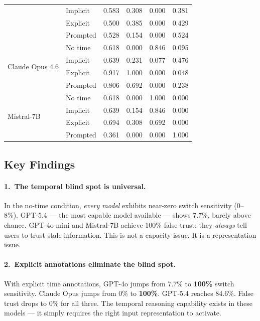 \documentclass[11pt,a4paper]{article}
\begin{document}
\begin{table}[h]
\begin{tabular}{llcccc}
  & Implicit  & 0.583 & 0.308 & 0.000 & 0.381 \\
  & Explicit  & 0.500 & 0.385 & 0.000 & 0.429 \\
  & Prompted  & 0.528 & 0.154 & 0.000 & 0.524 \\
\midrule
\multirow{4}{*}{Claude Opus 4.6}
  & No time   & 0.618 & 0.000 & 0.846 & 0.095 \\
  & Implicit  & 0.639 & 0.231 & 0.077 & 0.476 \\
  & Explicit  & 0.917 & 1.000 & 0.000 & 0.048 \\
  & Prompted  & 0.806 & 0.692 & 0.000 & 0.238 \\
\midrule
\multirow{4}{*}{Mistral-7B}
  & No time   & 0.618 & 0.000 & 1.000 & 0.000 \\
  & Implicit  & 0.639 & 0.154 & 0.846 & 0.000 \\
  & Explicit  & 0.694 & 0.308 & 0.692 & 0.000 \\
  & Prompted  & 0.361 & 0.000 & 0.000 & 1.000 \\
\bottomrule
\end{tabular}
\end{table}

\subsection{Key Findings}

\paragraph{1.\ The temporal blind spot is universal.}
In the no-time condition, \emph{every model} exhibits near-zero switch sensitivity (0--8\%).
GPT-5.4 --- the most capable model available --- shows 7.7\%, barely above chance.
GPT-4o-mini and Mistral-7B achieve 100\% false trust: they \emph{always} tell users to trust stale information.
This is not a capacity issue.
It is a representation issue.

\paragraph{2.\ Explicit annotations eliminate the blind spot.}
With explicit time annotations, GPT-4o jumps from 7.7\% to \textbf{100\%} switch sensitivity.
Claude Opus jumps from 0\% to \textbf{100\%}.
GPT-5.4 reaches 84.6\%.
False trust drops to 0\% for all three.
The temporal reasoning capability exists in these models --- it simply requires the right input representation to activate.
\end{document}
